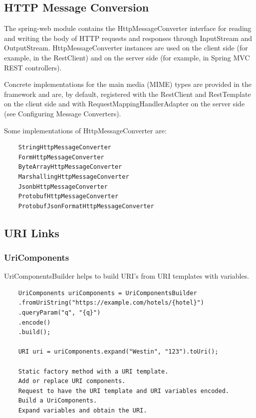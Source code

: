 \documentclass{scrartcl}
\begin{document}
\subsection{HTTP Message Conversion}

The spring-web module contains the HttpMessageConverter interface for reading and writing the body of HTTP requests and responses through InputStream and OutputStream. HttpMessageConverter instances are used on the client side (for example, in the RestClient) and on the server side (for example, in Spring MVC REST controllers).

Concrete implementations for the main media (MIME) types are provided in the framework and are, by default, registered with the RestClient and RestTemplate on the client side and with RequestMappingHandlerAdapter on the server side (see Configuring Message Converters).

Some implementations of HttpMessageConverter are:

    \begin{lstlisting}
    StringHttpMessageConverter
    FormHttpMessageConverter
    ByteArrayHttpMessageConverter
    MarshallingHttpMessageConverter
    JsonbHttpMessageConverter
    ProtobufHttpMessageConverter
    ProtobufJsonFormatHttpMessageConverter
    \end{lstlisting}

\subsection{URI Links}

\subsubsection{UriComponents}

UriComponentsBuilder helps to build URI’s from URI templates with variables.

\begin{lstlisting}
    UriComponents uriComponents = UriComponentsBuilder
    .fromUriString("https://example.com/hotels/{hotel}")
    .queryParam("q", "{q}")
    .encode()
    .build();

    URI uri = uriComponents.expand("Westin", "123").toUri();

    Static factory method with a URI template.
    Add or replace URI components.
    Request to have the URI template and URI variables encoded.
    Build a UriComponents.
    Expand variables and obtain the URI.

\end{lstlisting}
\end{document}
